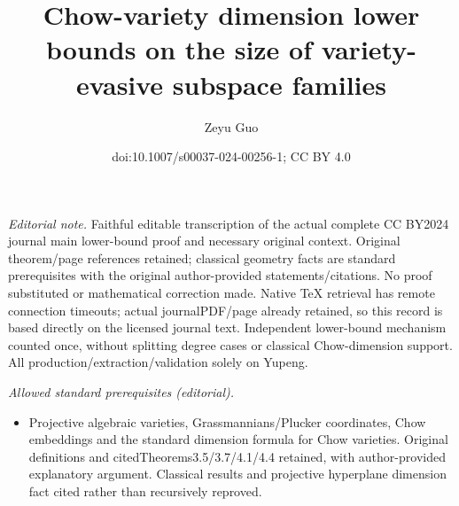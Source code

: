 \documentclass[10pt,a4paper]{article}
\title{Chow-variety dimension lower bounds on the size of variety-evasive subspace families}
\author{Zeyu Guo}
\date{doi:10.1007/s00037-024-00256-1; CC BY 4.0}
\begin{document}
\maketitle
\noindent\textit{Editorial note.} Faithful editable transcription of the actual complete CC BY2024 journal main lower-bound proof and necessary original context. Original theorem/page references retained; classical geometry facts are standard prerequisites with the original author-provided statements/citations. No proof substituted or mathematical correction made. Native TeX retrieval has remote connection timeouts; actual journalPDF/page already retained, so this record is based directly on the licensed journal text. Independent lower-bound mechanism counted once, without splitting degree cases or classical Chow-dimension support. All production/extraction/validation solely on Yupeng.\par\medskip
\noindent\textit{Allowed standard prerequisites (editorial).}\begin{itemize}
\item Projective algebraic varieties, Grassmannians/Plucker coordinates, Chow embeddings and the standard dimension formula for Chow varieties. Original definitions and citedTheorems3.5/3.7/4.1/4.4 retained, with author-provided explanatory argument. Classical results and projective hyperplane dimension fact cited rather than recursively reproved.
\end{itemize}\medskip
\end{document}
